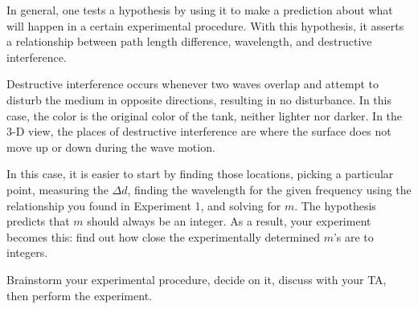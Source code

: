In general, one tests a hypothesis by using it to make a prediction about what will happen in a certain experimental procedure. With this hypothesis, it asserts a relationship between path length difference, wavelength, and destructive interference.

Destructive interference occurs whenever two waves overlap and attempt to disturb the medium in opposite directions, resulting in no disturbance. In this case, the color is the original color of the tank, neither lighter nor darker. In the 3-D view, the places of destructive interference are where the surface does not move up or down during the wave motion.



In this case, it is easier to start by finding those locations, picking a particular point, measuring the $\Delta d$, finding the wavelength for the given frequency using the relationship you found in Experiment 1, and solving for $m$. The hypothesis predicts that $m$ should always be an integer. As a result, your experiment becomes this: find out how close the experimentally determined $m$'s are to integers.

Brainstorm your experimental procedure, decide on it, discuss with your TA, then perform the experiment.

